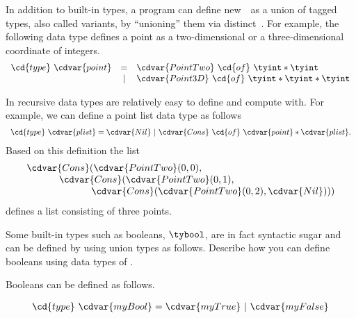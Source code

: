 \begin{gram}
In addition to built-in types, a program can define new~~as a
union of tagged types, also called variants, by ``unioning'' them via
distinct~.
%
For example, the following data type defines a point as a
two-dimensional or a three-dimensional coordinate of integers.
%
%
\[
\begin{array}{lcl}
\cd{type}~\cdvar{point} & = & \cdvar{PointTwo}~\cd{of}~\tyint * \tyint
\\
           & | & \cdvar{Point3D}~\cd{of}~\tyint * \tyint * \tyint
\end{array} 
\]
\end{gram}

\begin{gram}
In \pml recursive data types are relatively easy to define and compute
with. For example, we can define a point list data type as follows
%
\[
\begin{array}{l}
\cd{type}~\cdvar{plist} = \cdvar{Nil}~|~\cdvar{Cons}~\cd{of}~\cdvar{point} * \cdvar{plist}.
\end{array}
\] 
%
Based on this definition the list 
%
\[
\begin{array}{l}
\cdvar{Cons}(\cdvar{PointTwo} (0,0),  
\\
~~~~~~~~~~\cdvar{Cons}(\cdvar{PointTwo} (0,1), 
\\
~~~~~~~~~~~~~~~~~~~~\cdvar{Cons}(\cdvar{PointTwo}(0,2), \cdvar{Nil})))  
\end{array} 
\]
%
defines a list consisting of three points.
\end{gram}

\begin{flex}
\begin{exercise}[Booleans]
Some built-in types such as booleans, $\tybool$, are in fact syntactic
sugar and can be defined by using union types as follows.
%
Describe how you can define booleans using data types of \pml{}.
\end{exercise}

\begin{solution}
Booleans can be defined as follows.

\[
\begin{array}{l}
\cd{type}~\cdvar{myBool} = \cdvar{myTrue}~|~\cdvar{myFalse} 
\end{array}
\] 
%
\end{solution}
\end{flex}


